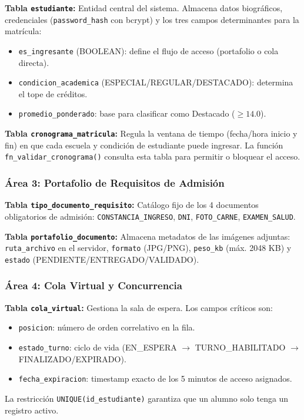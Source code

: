 \documentclass[12pt,a4paper]{article}
\begin{document}
\textbf{Tabla \texttt{estudiante}:} Entidad central del sistema. Almacena datos biogr\'aficos, credenciales (\texttt{password\_hash} con bcrypt) y los tres campos determinantes para la matr\'icula:
\begin{itemize}
  \item \texttt{es\_ingresante} (BOOLEAN): define el flujo de acceso (portafolio o cola directa).
  \item \texttt{condicion\_academica} (ESPECIAL/REGULAR/DESTACADO): determina el tope de cr\'editos.
  \item \texttt{promedio\_ponderado}: base para clasificar como Destacado ($\geq 14.0$).
\end{itemize}

\textbf{Tabla \texttt{cronograma\_matricula}:} Regula la ventana de tiempo (fecha/hora inicio y fin) en que cada escuela y condici\'on de estudiante puede ingresar. La funci\'on \texttt{fn\_validar\_cronograma()} consulta esta tabla para permitir o bloquear el acceso.

\subsubsection{\'Area 3: Portafolio de Requisitos de Admisi\'on}

\textbf{Tabla \texttt{tipo\_documento\_requisito}:} Cat\'alogo fijo de los 4 documentos obligatorios de admisi\'on: \texttt{CONSTANCIA\_INGRESO}, \texttt{DNI}, \texttt{FOTO\_CARNE}, \texttt{EXAMEN\_SALUD}.

\textbf{Tabla \texttt{portafolio\_documento}:} Almacena metadatos de las im\'agenes adjuntas: \texttt{ruta\_archivo} en el servidor, \texttt{formato} (JPG/PNG), \texttt{peso\_kb} (m\'ax. 2048 KB) y \texttt{estado} (PENDIENTE/ENTREGADO/VALIDADO).

\subsubsection{\'Area 4: Cola Virtual y Concurrencia}

\textbf{Tabla \texttt{cola\_virtual}:} Gestiona la sala de espera. Los campos cr\'iticos son:
\begin{itemize}
  \item \texttt{posicion}: n\'umero de orden correlativo en la fila.
  \item \texttt{estado\_turno}: ciclo de vida (EN\_ESPERA $\to$ TURNO\_HABILITADO $\to$ FINALIZADO/EXPIRADO).
  \item \texttt{fecha\_expiracion}: timestamp exacto de los 5 minutos de acceso asignados.
\end{itemize}
La restricci\'on \texttt{UNIQUE(id\_estudiante)} garantiza que un alumno solo tenga un registro activo.
\end{document}
